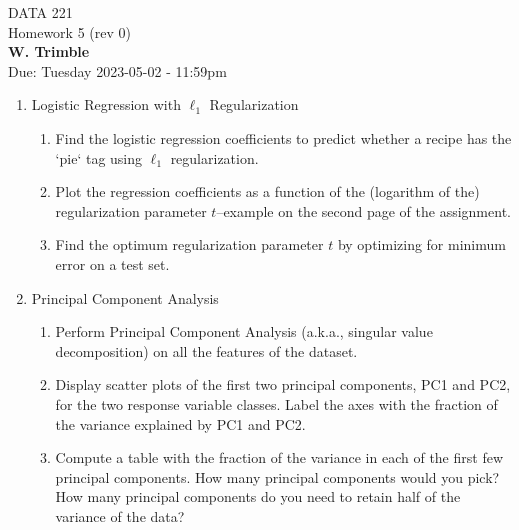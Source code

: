 \documentclass[12pt]{book}
\theoremstyle{definition}
\begin{document}
\begin{center}
{\Large DATA 221 \\  Homework 5  (rev 0)}\\
\textbf{W. Trimble}\\ %
Due: Tuesday 2023-05-02  - 11:59pm
\end{center}

\vspace{0.2 cm}


\begin{enumerate}[label=(\alph*)]

Kaggle user \texttt{hugodarwood} created a [dataset with over 20,000 recipes from the website Epicurious, scraped in 2017](https://www.kaggle.com/datasets/hugodarwood/epirecipes/code). Loosely speaking, there are a few groups of variables in the dataset: nutritional variables (`calories`, `protein`, `fat`, `sodium`),  Ingredient tags (`almond`, `amaretto`, `anchovy`, and so on), Place tags (`alabama`, `alaska`, `aspen`, `australia`, and so forth), and Other tags (`advance.prep.required`, `anthony.bourdain`, etc.).

You may want to carry out your own exploratory dataset to a) become familiar with the dataset, and b) carry out some pre-processing on the dataset. You will have to make choices during pre-processing--these choices are up to you. We are happy to offer suggestions during office hours, but as long as you feel that you have made a reasonable choice, we will not take points off.   

Once you have pre-processed the data...

  \item Logistic Regression with $\ell_1$ Regularization
  \begin{enumerate}
    \item Find the logistic regression coefficients to predict whether a recipe has the `pie` tag using $\ell_1$ regularization.  
    \item Plot the regression coefficients as a function of the (logarithm of the) regularization parameter $t$--example on the second page of the assignment. 
    \item Find the optimum regularization parameter $t$ by optimizing for minimum error on a test set.
  \end{enumerate}

  \item Principal Component Analysis 
  \begin{enumerate}
    \item Perform Principal Component Analysis (a.k.a., singular value decomposition) on all the features of the dataset. 
    \item Display scatter plots of the first two principal components, PC1 and PC2, for the two response variable classes. Label the axes with the fraction of the variance explained by PC1 and PC2. 
    \item Compute a table with the fraction of the variance in each of the first few principal components. How many principal components would you pick?  How many principal components do you need to retain half of the variance of the data?
  \end{enumerate}


\end{enumerate}
\end{document}
